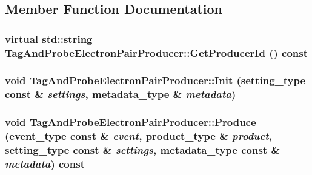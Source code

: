 \subsection{Member Function Documentation}
\hypertarget{classTagAndProbeElectronPairProducer_a378c649f26b158f90e9e0faacea2ac47}{
\subsubsection[{GetProducerId}]{\setlength{\rightskip}{0pt plus 5cm}virtual std::string TagAndProbeElectronPairProducer::GetProducerId () const}}
\label{classTagAndProbeElectronPairProducer_a378c649f26b158f90e9e0faacea2ac47}
\hypertarget{classTagAndProbeElectronPairProducer_a24874428037dc66e71e7f6f90f240612}{
\subsubsection[{Init}]{\setlength{\rightskip}{0pt plus 5cm}void TagAndProbeElectronPairProducer::Init (setting\_\-type const \& {\em settings}, \/  metadata\_\-type \& {\em metadata})}}
\label{classTagAndProbeElectronPairProducer_a24874428037dc66e71e7f6f90f240612}
\hypertarget{classTagAndProbeElectronPairProducer_a8ce87461c4370a9cee8acbd5b95d4054}{
\subsubsection[{Produce}]{\setlength{\rightskip}{0pt plus 5cm}void TagAndProbeElectronPairProducer::Produce (event\_\-type const \& {\em event}, \/  product\_\-type \& {\em product}, \/  setting\_\-type const \& {\em settings}, \/  metadata\_\-type const \& {\em metadata}) const}}
\label{classTagAndProbeElectronPairProducer_a8ce87461c4370a9cee8acbd5b95d4054}
